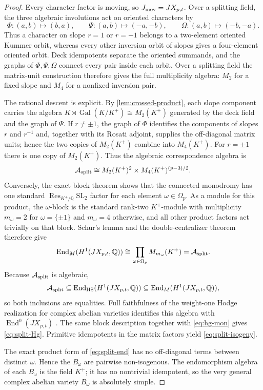 \documentclass[11pt]{article}
\theoremstyle{definition}
\theoremstyle{remark}
\newcommand{\Q}{\mathbb Q}
\newcommand{\End}{\operatorname{End}}
\newcommand{\Gal}{\operatorname{Gal}}
\newcommand{\Res}{\operatorname{Res}}
\begin{document}
\begin{proof}
Every character factor is moving, so $J_{\rm mov}=JX_{p,t}$.  Over a splitting field, the three algebraic involutions act on oriented characters by
\[
 \Phi:(a,b)\mapsto(b,a),
 \qquad
 \Psi:(a,b)\mapsto(-a,-b),
 \qquad
 \Omega:(a,b)\mapsto(-b,-a).
\]
Thus a character on slope $r=1$ or $r=-1$ belongs to a two-element oriented Kummer orbit, whereas every other inversion orbit of slopes gives a four-element oriented orbit.  Deck idempotents separate the oriented summands, and the graphs of $\Phi,\Psi,\Omega$ connect every pair inside each orbit.  Over a splitting field the matrix-unit construction therefore gives the full multiplicity algebra: $M_2$ for a fixed slope and $M_4$ for a nonfixed inversion pair.

The rational descent is explicit.  By \cref{lem:crossed-product}, each slope component carries the algebra $K\rtimes\Gal(K/K^+)\cong M_2(K^+)$ generated by the deck field and the graph of $\Psi$.  If $r\ne\pm1$, the graph of $\Phi$ identifies the components of slopes $r$ and $r^{-1}$ and, together with its Rosati adjoint, supplies the off-diagonal matrix units; hence the two copies of $M_2(K^+)$ combine into $M_4(K^+)$.  For $r=\pm1$ there is one copy of $M_2(K^+)$.  Thus the algebraic correspondence algebra is
\[
 \mathcal A_{\rm split}
 \cong M_2(K^+)^2\times M_4(K^+)^{(p-3)/2}.
\]
Conversely, the exact block theorem shows that the connected monodromy has one standard $\Res_{K^+/\Q}\mathrm{SL}_2$ factor for each element $\omega\in\Omega_p$.  As a module for this product, the $\omega$-block is the standard rank-two $K^+$-module with multiplicity $m_\omega=2$ for $\omega=\{\pm1\}$ and $m_\omega=4$ otherwise, and all other product factors act trivially on that block.  Schur's lemma and the double-centralizer theorem therefore give
\[
 \End_M(H^1(JX_{p,t},\Q))
 \cong\prod_{\omega\in\Omega_p}M_{m_\omega}(K^+)
 =\mathcal A_{\rm split}.
\]
Because $\mathcal A_{\rm split}$ is algebraic,
\[
 \mathcal A_{\rm split}
 \subseteq\End_{\rm HS}(H^1(JX_{p,t},\Q))
 \subseteq\End_M(H^1(JX_{p,t},\Q)),
\]
so both inclusions are equalities.  Full faithfulness of the weight-one Hodge realization for complex abelian varieties identifies this algebra with $\End^0(JX_{p,t})$ \cite{BL}.  The same block description together with \eqref{eq:hg-mon} gives \eqref{eq:split-Hg}.  Primitive idempotents in the matrix factors yield \eqref{eq:split-isogeny}.

The exact product form of \eqref{eq:split-end} has no off-diagonal terms between distinct $\omega$.  Hence the $B_\omega$ are pairwise non-isogenous.  The endomorphism algebra of each $B_\omega$ is the field $K^+$; it has no nontrivial idempotent, so the very general complex abelian variety $B_\omega$ is absolutely simple.


\end{proof}
\end{document}
